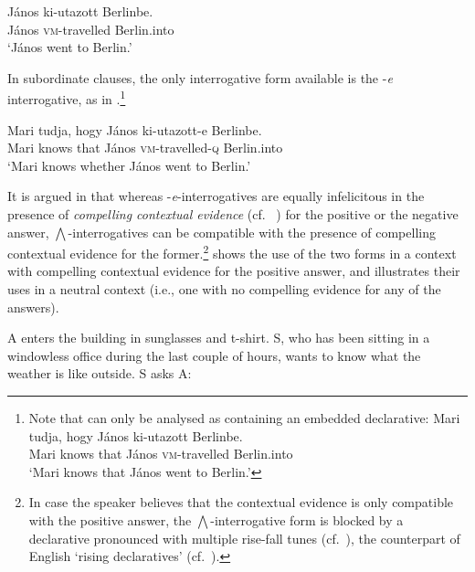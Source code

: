 \documentclass[output=paper,colorlinks,citecolor=brown]{langscibook}
\begin{document}
	\ea\label{ex:elutazott} 
	\gll J\'anos ki-utazott Berlinbe.\\
	J\'anos \textsc{vm}-travelled Berlin.into\\
	\glt `János went to Berlin.'
	\z
	
	In subordinate clauses, the only interrogative form available is the \nobreakdash-\textit{e} interrogative, as in .\footnote{Note that  can only be analysed as containing an embedded declarative:
		\ea\label{ex:tudja-elutazott}
		\gll Mari tudja, hogy János ki-utazott Berlinbe.\\
		Mari knows that János \textsc{vm}-travelled Berlin.into\\
		\glt `Mari knows that János went to Berlin.'
		\z
	}
	
	\ea\label{ex:tudja-elutazott-e}
	\gll Mari tudja, hogy János ki-utazott-e Berlinbe.\\
	Mari knows that János \textsc{vm}-travelled-\textsc{q} Berlin.into\\
	\glt `Mari knows whether János went to Berlin.'
	\z
	
	
	It is argued in \citet{Gyuris2017} that whereas \nobreakdash-\textit{e}-interrogatives are equally infelicitous in the presence of \textit{compelling contextual evidence} (cf.~ \citealt{buring+gunlogson})  for the positive or the negative answer, $\bigwedge$-interrogatives can be compatible with the presence of compelling contextual evidence  for  the former.\footnote{In case the speaker believes that the contextual evidence is only compatible with the positive answer, the  $\bigwedge$-interrogative form is blocked by a declarative pronounced with multiple rise-fall tunes (cf.~\citealt{gyuris19, varga2010}), the counterpart of English `rising declaratives' (cf.~\citealt{gunlogson2003}).} 
	 shows the use of the two forms in a context with compelling contextual evidence for the positive answer, and  illustrates their uses in a neutral context (i.e., one with no compelling evidence for any of the answers).
	

	
	\ea\label{ex:sunglasses} A enters the building in sunglasses and t-shirt. S, who has been sitting in a windowless office during the last couple of hours, wants to know what the weather is like outside. S asks A:
	\z
	\z
	
\end{document}
